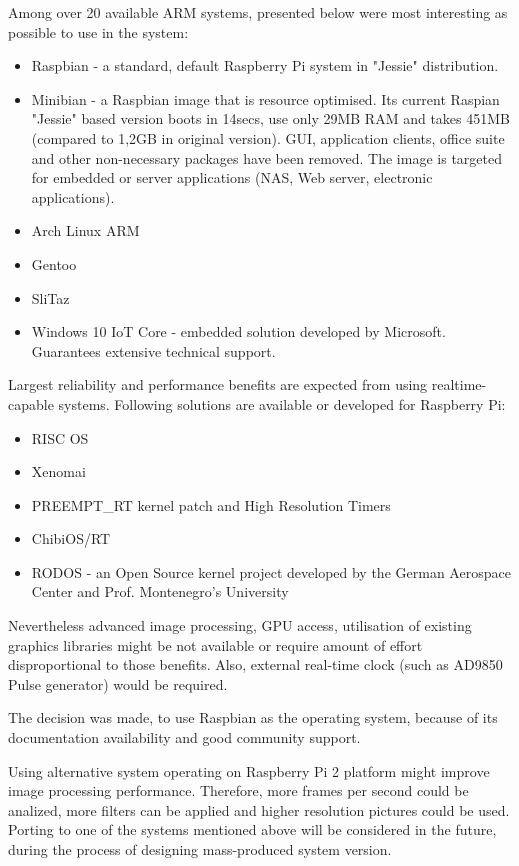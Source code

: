 \documentclass[12pt,twoside,a4paper]{article}
\begin{document}
Among over 20 available ARM systems, presented below were most interesting as possible to use in the system:
\begin{itemize}
  \item Raspbian - a standard, default Raspberry Pi system in "Jessie" distribution.
  \item Minibian - a Raspbian image that is resource optimised.
  Its current Raspian "Jessie" based version boots in 14secs, use only 29MB RAM and takes 451MB (compared to 1,2GB in original version). GUI, application clients, office suite and other non-necessary packages have been removed. The image is targeted for embedded or server applications (NAS, Web server, electronic applications).
  \item Arch Linux ARM
  \item Gentoo
  \item SliTaz
  \item Windows 10 IoT Core - embedded solution developed by Microsoft. Guarantees extensive technical support.
\end{itemize}

Largest reliability and performance benefits are expected from using realtime-capable systems.
Following solutions are available or developed for Raspberry Pi:

\begin{itemize}
  \item RISC OS
  \item Xenomai
  \item PREEMPT\_RT kernel patch and High Resolution Timers\cite{stackos}
  \item ChibiOS/RT\cite{chibi}
  \item RODOS - an Open Source kernel project developed by the German Aerospace Center and Prof. Montenegro's University\cite{rodos}
\end{itemize}

Nevertheless advanced image processing, GPU access, utilisation of existing graphics libraries might be not available or require amount of effort disproportional to those benefits.
Also, external real-time clock (such as AD9850 Pulse generator) would be required.

The decision was made, to use Raspbian as the operating system, because of its documentation availability and good community support.

Using alternative system operating on Raspberry Pi 2 platform might improve image processing performance. Therefore, more frames per second could be analized, more filters can be applied and higher resolution pictures could be used.
Porting to one of the systems mentioned above will be considered in the future, during the process of designing mass-produced system version.
\end{document}
